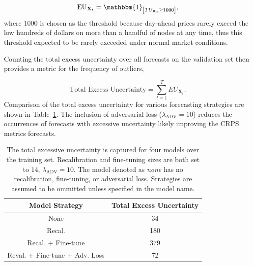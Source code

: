 \begin{equation*}
    \text{EU}_{\mathbf{X}_t} = \mathbbm{1}_{\left[ TU_{\mathbf{X}_t} \geq 1000 \right]},
    \label{eq:excess_unc}
\end{equation*}
where 1000 is chosen as the threshold because day-ahead prices rarely exceed the low hundreds of dollars on more than a
handful of nodes at any time, thus this threshold expected to be rarely exceeded under normal market conditions.

Counting the total excess uncertainty over all forecasts on the validation set then provides a metric for the
frequency of outliers,

\begin{equation*}
    \text{Total Excess Uncertainty} = \sum_{t=1}^{T} EU_{\textbf{X}_t}.
    \label{eq:total_unc}
\end{equation*}
Comparison of the total excess uncertainty for various forecasting strategies are shown in Table~\ref{tab:total_unc}.
The inclusion of adversarial loss ($\lambda_{\text{ADV}} = 10$) reduces the occurrences of forecasts with excessive
uncertainty likely improving the CRPS metrics forecasts.

\begin{table}[htb]
    \caption[Count of forecasts with excessive uncertainty over various models]{
        The total excessive uncertainty is captured for four models over the training set.
        Recalibration and fine-tuning sizes are both set to $14$, $\lambda_{\text{ADV}} = 10$.
        The model denoted as \textit{none} has no recalibration, fine-tuning, or adversarial loss.
        Strategies are assumed to be ommitted unless specified in the model name.
    }
    \begin{center}
        \begin{tabular}{||c|c||} \hline
        Model Strategy & Total Excess Uncertainty  \\	%
        \hline \hline
        None                            & 34 \\ \hline
        Recal.                          & 180 \\ \hline
        Recal. + Fine-tune              & 379 \\ \hline
        Reval. + Fine-tune + Adv. Loss  & 72 \\ \hline
        \end{tabular}
        \\ \rule{0mm}{5mm}
    \end{center}
    \label{tab:total_unc}
\end{table}


